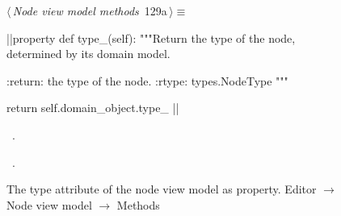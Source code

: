 \documentclass[%
    a4paper,    %
    justified,  %
    nobib,      %
    openany     %
]{tufte-book}
\makeatletter
\renewcommand{\label}[1]{\@tufte@label{##1}}%
\makeatother
\begin{document}
\begin{figure}[!htbp]
\begin{flushleft} \small
\begin{minipage}{\linewidth}\label{scrap69}\raggedright\small
{} $\langle\,${\itshape Node view model methods}\nobreak\ {\footnotesize {129a}}$\,\rangle\equiv$
\vspace{-1ex}
\begin{pythoncode}
|\normalfont{}\fontfamily{}|property
def type_(self):
    """Return the type of the node, determined by its domain model.

    :return: the type of the node.
    :rtype: types.NodeType
    """

    return self.domain_object.type_
|\NWsep|
\end{pythoncode}
\vspace{1.5ex}
\footnotesize
\begin{list}{}{\setlength{\itemsep}{-\parsep}\setlength{\itemindent}{-\leftmargin}}
\item \NWtxtMacroDefBy\ .
\item \NWtxtMacroRefIn\ .

\item{}
\end{list}
\end{minipage}\vspace{4ex}
\end{flushleft}
\caption{The type attribute of the node view model as property.
  \newline{}\newline{}Editor $\rightarrow$ Node view model $\rightarrow$
  Methods}
\end{figure}
\end{document}
